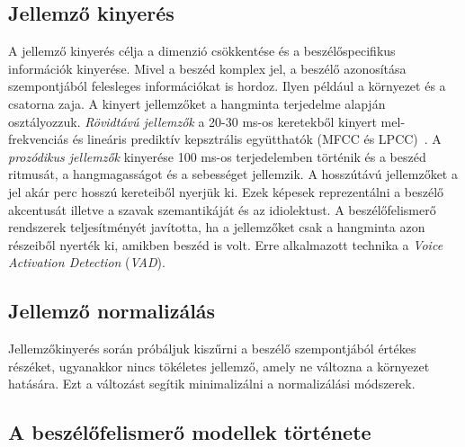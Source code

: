\subsection{Jellemző kinyerés}
A jellemző kinyerés célja a dimenzió csökkentése és a beszélőspecifikus információk kinyerése. Mivel a beszéd komplex jel, a beszélő azonosítása szempontjából felesleges információkat is hordoz. Ilyen például a környezet és a csatorna zaja. A kinyert jellemzőket a hangminta terjedelme alapján osztályozzuk. \emph{Rövidtávú jellemzők} a 20-30 ms-os keretekből kinyert mel-frekvenciás és lineáris prediktív kepsztrális együtthatók (MFCC és LPCC)~\cite{taufiq_2015}. A \emph{prozódikus jellemzők} kinyerése 100 ms-os terjedelemben történik és a beszéd ritmusát, a hangmagasságot és a sebességet jellemzik. A hosszútávú jellemzőket a jel akár perc hosszú kereteiből nyerjük ki. Ezek képesek reprezentálni a beszélő akcentusát illetve a szavak szemantikáját és az idiolektust.
\newline
\newline
A beszélőfelismerő rendszerek teljesítményét javította, ha a jellemzőket csak
a hangminta azon részeiből nyerték ki, amikben beszéd is volt. Erre alkalmazott technika a \emph{Voice Activation Detection} (\emph{VAD}).

\subsection{Jellemző normalizálás}

Jellemzőkinyerés során próbáljuk kiszűrni a beszélő szempontjából értékes részéket, ugyanakkor nincs tökéletes jellemző, amely ne változna a környezet hatására. Ezt a változást segítik minimalizálni a normalizálási módszerek.

\subsection{A beszélőfelismerő modellek története}

